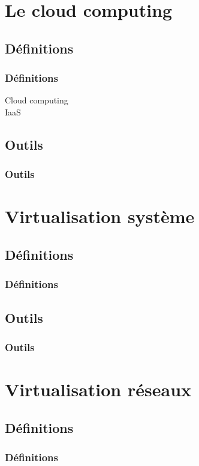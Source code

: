 \documentclass{beamer}
\begin{document}
			
			
	\section{Le cloud computing}
	
		\subsection{Définitions}
			\begin{frame}
			  \frametitle{Définitions}
			  \begin{description}
			    \item[Cloud computing]
			    \item[IaaS] 
			  \end{description}
			\end{frame}
			
		\subsection{Outils}
			\begin{frame}
				\frametitle{Outils}
				
			\end{frame}
			
			
	\section{Virtualisation système}
	
		\subsection{Définitions}
			\begin{frame}
			  \frametitle{Définitions}
			\end{frame}
			
		\subsection{Outils}
			\begin{frame}
				\frametitle{Outils}
			\end{frame}
			
			
	\section{Virtualisation réseaux}
	
		\subsection{Définitions}
			\begin{frame}
			  \frametitle{Définitions}
			\end{frame}
			
\end{document}
